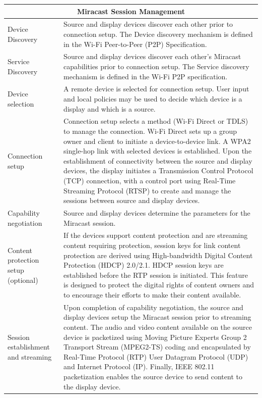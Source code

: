 \begin{center}
    \begin{tabular}{ | p{3.5cm} | p{10cm} |}
     \hline
    \multicolumn{2}{c}{Miracast Session Management}\\
    \hline
    Device Discovery  & Source and display devices discover each other prior to
    connection setup. The Device discovery mechanism is defined in the Wi-Fi
    Peer-to-Peer (P2P) Specification. \\ \hline 
    
    Service Discovery  & Source and display devices discover each other's
    Miracast capabilities prior to connection setup. The Service discovery
    mechanism is defined in the Wi-Fi P2P specification. \\ \hline
    
    Device selection &A remote device is selected for connection setup. User
    input and local policies may be used to decide which device is a display
    and which is a source. \\ \hline 
    
    Connection setup & Connection setup selects a method (Wi-Fi Direct or TDLS)
    to manage the connection. Wi-Fi Direct sets up a group owner and client to
    initiate a device-to-device link. A WPA2 single-hop link with selected
    devices is established. Upon the establishment of connectivity between the
    source and display devices, the display initiates a Transmission Control
    Protocol (TCP) connection, with a control port using Real-Time Streaming
    Protocol (RTSP) to create and manage the sessions between source and
    display devices. \\
    \hline
    
    Capability negotiation & Source and display devices determine the parameters
    for the Miracast session. \\ \hline
    
    Content protection setup (optional) & If the devices support content
    protection and are streaming content requiring protection, session keys for
    link content protection are derived using High-bandwidth Digital Content
    Protection (HDCP) 2.0/2.1. HDCP session keys are established before the RTP
    session is initiated. This feature is designed to protect the digital
    rights of content owners and to encourage their efforts to make their
    content available. \\ \hline
    
    Session establishment and streaming & Upon completion of capability
    negotiation, the source and display devices setup the Miracast session
    prior to streaming content.
    The audio and video content available on the source device is packetized
    using Moving Picture Experts Group 2 Transport Stream (MPEG2-TS) coding and
    encapsulated by Real-Time Protocol (RTP) User Datagram Protocol (UDP) and
    Internet Protocol (IP). Finally, IEEE 802.11 packetization enables the
    source device to send content to the display device. \\ \hline
    

\end{tabular}
\end{center}
